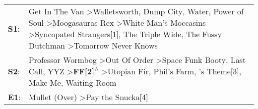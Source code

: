 \begin{supertabular}{p{0.03\textwidth}p{0.92\textwidth}}
 \textbf{S1}:  &  Get In The Van\textsuperscript{} \textgreater \enspace Walletsworth\textsuperscript{}, \enspace Dump City\textsuperscript{}, \enspace Water\textsuperscript{}, \enspace Power of Soul\textsuperscript{} \textgreater \enspace Moogasauras Rex\textsuperscript{} \textgreater \enspace White Man's Moccasins\textsuperscript{} \textgreater \enspace Syncopated Strangers[1]\textsuperscript{}, \enspace The Triple Wide\textsuperscript{}, \enspace The Fussy Dutchman\textsuperscript{} \textgreater \enspace Tomorrow Never Knows\textsuperscript{}  \enspace  \\
 \textbf{S2}:  &                                              Professor Wormbog\textsuperscript{} \textgreater \enspace Out Of Order\textsuperscript{} \textgreater \enspace Space Funk Booty\textsuperscript{}, \enspace Last Call\textsuperscript{}, \enspace YYZ\textsuperscript{} \textgreater \enspace \textbf{FF[2]\textsuperscript{$\wedge$}} \textgreater \enspace Utopian Fir\textsuperscript{}, \enspace Phil's Farm\textsuperscript{}, 's Theme[3]\textsuperscript{}, \enspace Make Me\textsuperscript{}, \enspace Waiting Room\textsuperscript{}  \enspace  \\
 \textbf{E1}:  &                                                                                                                                                                                                                                                                                                                                                                                                                                                              Mullet (Over)\textsuperscript{} \textgreater \enspace Pay the Snucka[4]\textsuperscript{}  \enspace  \\
\end{supertabular}
